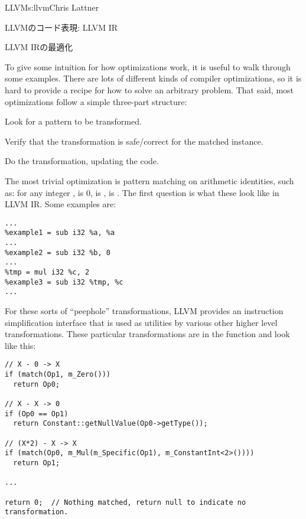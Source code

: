 \begin{aosachapter}{LLVM}{s:llvm}{Chris Lattner}
\begin{aosasect1}{LLVMのコード表現: LLVM IR}
\begin{aosasect2}{LLVM IRの最適化}

To give some intuition for how optimizations work, it is useful to
walk through some examples.  There are lots of different kinds of
compiler optimizations, so it is hard to provide a recipe for how to
solve an arbitrary problem.  That said, most optimizations follow a
simple three-part structure:

\begin{aosaitemize}

  \item Look for a pattern to be transformed.

  \item Verify that the transformation is safe/correct for the matched
  instance.

  \item Do the transformation, updating the code.

\end{aosaitemize}

The most trivial optimization is pattern matching on arithmetic
identities, such as: for any integer ,  is 0,
 is ,  is .  The first
question is what these look like in LLVM IR\@.  Some examples are:

\begin{verbatim}
...
%example1 = sub i32 %a, %a
...
%example2 = sub i32 %b, 0
...
%tmp = mul i32 %c, 2
%example3 = sub i32 %tmp, %c
...
\end{verbatim}

For these sorts of ``peephole'' transformations, LLVM provides an
instruction simplification interface that is used as utilities by
various other higher level transformations.  These particular
transformations are in the  function and look
like this:

\begin{verbatim}
// X - 0 -> X
if (match(Op1, m_Zero()))
  return Op0;

// X - X -> 0
if (Op0 == Op1)
  return Constant::getNullValue(Op0->getType());

// (X*2) - X -> X
if (match(Op0, m_Mul(m_Specific(Op1), m_ConstantInt<2>())))
  return Op1;

...

return 0;  // Nothing matched, return null to indicate no transformation.
\end{verbatim}


\end{aosasect2}
\end{aosasect1}
\end{aosachapter}
